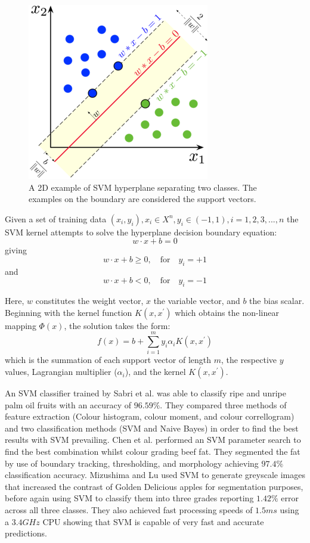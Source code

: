 \documentclass[fleqn,twoside,12pt]{report}
\begin{document}
\begin{figure}[h]
	\centering
	\includegraphics[width=0.5\linewidth]{SVM.png}
	\caption{A 2D example of SVM hyperplane separating two classes. The examples on the boundary are considered the support vectors.}
	\label{fig:SVM}
\end{figure}%

Given a set of training data {$(x_i, y_i), x_i \in X^n, y_i \in (-1,1), i = 1,2,3,...,n$} the SVM kernel attempts to solve the hyperplane decision boundary equation:
\begin{equation}
w \cdot x + b = 0
\end{equation} 
giving
\begin{equation}
w \cdot x + b \geq 0, \quad \textrm{for} \quad y_i = +1
\end{equation}
and
\begin{equation}
w \cdot x + b < 0, \quad \textrm{for} \quad y_i = -1
\end{equation}

Here, $w$ constitutes the weight vector, $x$ the variable vector, and $b$ the bias scalar. Beginning with the kernel function $K(x, x^\prime)$ which obtains the non-linear mapping $\Phi(x)$, the solution takes the form:
\begin{equation}
f(x) = b + \sum_{i=1}^{m} y_i \alpha_i K(x, x^\prime)
\end{equation}
which is the summation of each support vector of length $m$, the respective $y$ values, Lagrangian multiplier ($\alpha_i$), and the kernel $K(x, x^\prime)$.


An SVM classifier trained by Sabri et al.\cite{sabri} was able to classify ripe and unripe palm oil fruits with an accuracy of $96.59\%$. They compared three methods of feature extraction (Colour histogram, colour moment, and colour correllogram) and two classification methods (SVM and Naive Bayes) in order to find the best results with SVM prevailing. Chen et al.\cite{chen} performed an SVM parameter search to find the best combination whilst colour grading beef fat. They segmented the fat by use of boundary tracking, thresholding, and morphology achieving $97.4\%$ classification accuracy. Mizushima and Lu \cite{mizushima} used SVM to generate greyscale images that increased the contrast of Golden Delicious apples for segmentation purposes, before again using SVM to classify them into three grades reporting $1.42\%$ error across all three classes. They also achieved fast processing speeds of $1.5ms$ using a $3.4 GHz$ CPU showing that SVM is capable of very fast and accurate predictions. 
\end{document}

